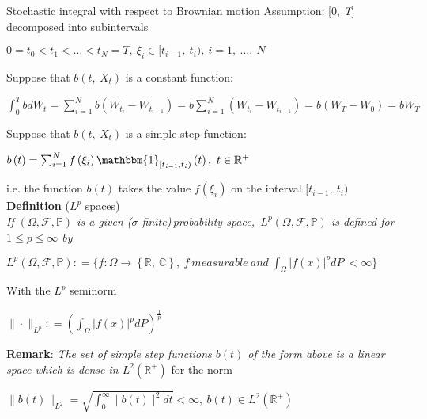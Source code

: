 \documentclass{article}
\begin{document}
\noindent
Stochastic integral with respect to Brownian motion
Assumption: [0, \textit{T}] decomposed into subintervals
\begin{center}
	$0=t_{0}<t_{1}<\ldots <t_{N}=T,\  \xi_{i} \in [t_{i-1},\  t_{i}),\  i=1,\  \ldots ,\  N$
\end{center}
Suppose that $b\left( t,\  X_{t}\right) $ is a constant function:
\begin{center}
	$\int^{T}_{0} bdW_{t}=\sum^{N}_{i=1} b\left( W_{t_{i}}-W_{t_{i-1}}\right)  =b\sum^{N}_{i=1} \left( W_{t_{i}}-W_{t_{i-1}}\right)  =b\left( W_{T}-W_{0}\right)  =bW_{T}$
\end{center}
Suppose that $b\left( t,\  X_{t}\right) $ is a simple step-function:
\begin{center}
	$b\left( t\right)  =\sum^{N}_{i=1} f\left( \xi_{i} \right)  \mathbbm{1}_{[t_{i-1},t_{i})}\left( t\right)  ,\  t\in \mathbb{R}^{+}$
\end{center}
i.e. the function $b\left( t\right)  $ takes the value 
$f\left( \xi_{i} \right) $ on the interval $[t_{i-1},\  t_{i})$\\

\noindent
\textbf{Definition} ($L^{p}$ spaces)\\
\textit{If $\left( \Omega ,\mathscr{F},\mathbb{P}\right) $ is a given ($\sigma$-finite)\,probability space,\, $L^{p}\left( \Omega ,\mathscr{F},\mathbb{P}\right)  $ is defined for $1\leqslant p\leqslant \infty $ by}
\begin{center}
	$L^{p}\left( \Omega ,\mathscr{F},\mathbb{P}\right)  \colon =\{ f:\Omega \longrightarrow \left\{ \mathbb{R},\  \mathbb{C}\right\}  ,\  f\  measurable\  and\  \int_{\Omega } \left| f\left( x\right)  \right|^{p}  dP\  <\infty \} $
\end{center}
With the $L^{p}$ seminorm
\begin{center}
	$\| \cdot \|_{L^{p}} \colon =\left( \int_{\Omega } |f\left( x\right)  |^{p}dP\right)^{\frac{1}{p} }  $
\end{center}

\noindent
\textbf{Remark}: \textit{The set of simple step functions $b\left( t\right)  $ of the form above is a linear space which is dense in $L^{2}\left( \mathbb{R}^{+} \right)  $} for the norm
\begin{center}
	$\parallel b\left( t\right)  \parallel_{L^{2}} =\sqrt{\int^{\infty }_{0} \mid b\left( t\right)  \mid^{2} dt} <\infty ,\  b\left( t\right)  \in L^{2}\left( \mathbb{R}^{+} \right)  $
\end{center}
\end{document}
